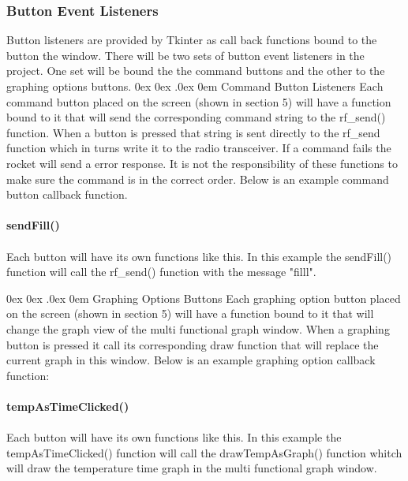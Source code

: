 \documentclass[10pt,draftclsnofoot,onecolumn,compsoc]{IEEEtran}
\makeatletter
\renewcommand\paragraph{\@startsection{paragraph}{4}{\z@}%
                                    {0ex \@plus0ex \@minus.0ex}%
                                    {0em}%
                                    {\normalfont\normalsize\bfseries}}
\makeatother
\begin{document}
\subsubsection{Button Event Listeners}
Button listeners are provided by Tkinter as call back functions bound to the button the window. There will be two sets of button event listeners in the project. One set will be bound the the command buttons and the other to the graphing options buttons.
\paragraph{Command Button Listeners}
Each command button placed on the screen (shown in section 5) will have a function bound to it that will send the corresponding command string to the rf\_send() function. When a button is pressed that string is sent directly to the rf\_send function which in turns write it to the radio transceiver. If a command fails the rocket will send a error response. It is not the responsibility of these functions to make sure the command is in the correct order. Below is an example command button callback function. \\ \\
{\bf sendFill() }
\\  \\
Each button will have its own functions like this. In this example the sendFill() function will call the rf\_send() function with the message "filll".

\paragraph{Graphing Options Buttons}
Each graphing option button placed on the screen (shown in section 5) will have a function bound to it that will change the graph view of the multi functional graph window. When a graphing button is pressed it call its corresponding draw function that will replace the current graph in this window. Below is an example graphing option callback function: \\ \\
{\bf tempAsTimeClicked()} \\ \\
Each button will have its own functions like this. In this example the tempAsTimeClicked() function will call the drawTempAsGraph() function whitch will draw the temperature time graph in the multi functional graph window.
\end{document}
